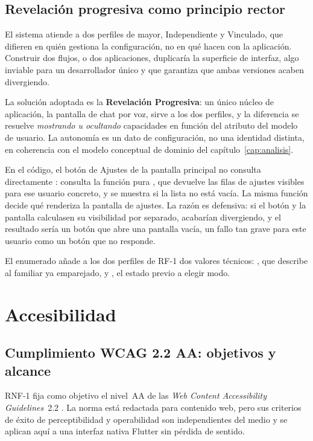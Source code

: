 \subsection{Revelación progresiva como principio rector}

El sistema atiende a dos perfiles de mayor, Independiente y Vinculado, que difieren en quién gestiona
la configuración, no en qué hacen con la aplicación. Construir dos flujos, o dos aplicaciones, duplicaría
la superficie de interfaz, algo inviable para un desarrollador único y que garantiza que ambas versiones
acaben divergiendo.

La solución adoptada es la \textbf{Revelación Progresiva}: un único núcleo de aplicación, la pantalla de chat por voz, sirve a los dos perfiles, y la diferencia se resuelve \emph{mostrando u
ocultando} capacidades en función del atributo  del modelo de usuario. La autonomía es un
dato de configuración, no una identidad distinta, en coherencia con el modelo conceptual de dominio del
capítulo~\ref{cap:analisis}.

En el código, el botón de Ajustes de la pantalla principal no consulta directamente :
consulta la función pura , que devuelve las filas de ajustes visibles para
ese usuario concreto, y se muestra si la lista no está vacía. La misma función decide qué renderiza la
pantalla de ajustes. La razón es defensiva: si el botón y la pantalla calculasen su visibilidad por
separado, acabarían divergiendo, y el resultado sería un botón que abre una pantalla vacía, un fallo tan
grave para este usuario como un botón que no responde.

El enumerado  añade a los dos perfiles de RF-1 dos valores técnicos: ,
que describe al familiar ya emparejado, y , el estado previo a elegir modo.

\section{Accesibilidad}
\label{sec:accesibilidad}

\subsection{Cumplimiento WCAG 2.2 AA: objetivos y alcance}

RNF-1 fija como objetivo el nivel~AA de las \emph{Web Content Accessibility Guidelines}~2.2
\autocite{wcag}. La norma está redactada para contenido web, pero sus criterios de éxito de
perceptibilidad y operabilidad son independientes del medio y se aplican aquí a una interfaz nativa
Flutter sin pérdida de sentido.


